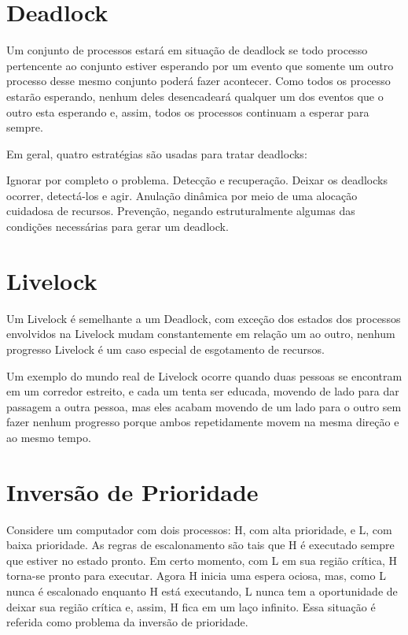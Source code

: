 \section{Deadlock}

Um conjunto de processos estará em situação de deadlock se todo processo pertencente ao conjunto estiver esperando por um evento que somente um outro processo desse mesmo conjunto poderá fazer acontecer. Como todos os processo estarão esperando, nenhum deles desencadeará qualquer um dos eventos que o outro esta esperando e, assim, todos os processos continuam a esperar para sempre.

Em geral, quatro estratégias são usadas para tratar deadlocks:

Ignorar por completo o problema.
Detecção e recuperação. Deixar os deadlocks ocorrer, detectá-los e agir.
Anulação dinâmica por meio de uma alocação cuidadosa de recursos.
Prevenção, negando estruturalmente algumas das condições necessárias para gerar um deadlock.

\section{Livelock}

Um Livelock é semelhante a um Deadlock, com exceção dos estados dos processos envolvidos na Livelock mudam constantemente em relação um ao outro, nenhum progresso Livelock é um caso especial de esgotamento de recursos.

Um exemplo do mundo real de Livelock ocorre quando duas pessoas se encontram em um corredor estreito, e cada um tenta ser educada, movendo de lado para  dar passagem a outra pessoa, mas eles acabam movendo de um lado para o outro sem fazer nenhum progresso porque ambos repetidamente movem na mesma direção e ao mesmo tempo.

\section{Inversão de Prioridade}

Considere um computador com dois processos: H, com alta prioridade, e L, com baixa prioridade. As regras de escalonamento são tais que H é executado sempre que estiver no estado pronto. Em certo momento, com L em sua região crítica, H torna-se pronto para executar. Agora H inicia uma espera ociosa, mas, como L nunca é escalonado enquanto H está executando, L nunca tem a oportunidade de deixar sua região crítica e, assim, H fica em um laço infinito. Essa situação é referida como problema da inversão de prioridade.

